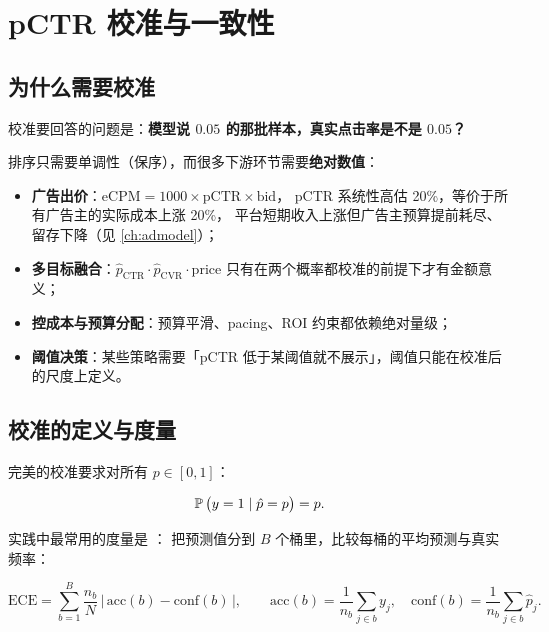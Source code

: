 \section{pCTR 校准与一致性}

\subsection{为什么需要校准}

校准要回答的问题是：\textbf{模型说 $0.05$ 的那批样本，真实点击率是不是 $0.05$？}

排序只需要单调性（保序），而很多下游环节需要\textbf{绝对数值}：

\begin{itemize}
  \item \textbf{广告出价}：$\mathrm{eCPM} = 1000 \times \mathrm{pCTR} \times \mathrm{bid}$，
        pCTR 系统性高估 20\%，等价于所有广告主的实际成本上涨 20\%，
        平台短期收入上涨但广告主预算提前耗尽、留存下降（见 \cref{ch:admodel}）；
  \item \textbf{多目标融合}：$\hat{p}_{\mathrm{CTR}} \cdot \hat{p}_{\mathrm{CVR}} \cdot \text{price}$
        只有在两个概率都校准的前提下才有金额意义；
  \item \textbf{控成本与预算分配}：预算平滑、pacing、ROI 约束都依赖绝对量级；
  \item \textbf{阈值决策}：某些策略需要「pCTR 低于某阈值就不展示」，阈值只能在校准后的尺度上定义。
\end{itemize}

\subsection{校准的定义与度量}

完美的校准要求对所有 $p \in [0,1]$：

\begin{equation}
\operatorname{\mathbb{P}}\big( y = 1 \mid \hat{p} = p \big) = p .
\label{eq:calibration-def}
\end{equation}

实践中最常用的度量是 ：
把预测值分到 $B$ 个桶里，比较每桶的平均预测与真实频率：

\begin{equation}
\mathrm{ECE} = \sum_{b=1}^{B} \frac{n_b}{N} \, \Big| \, \mathrm{acc}(b) - \mathrm{conf}(b) \, \Big| ,
\qquad
\mathrm{acc}(b) = \frac{1}{n_b}\sum_{j \in b} y_j, \quad
\mathrm{conf}(b) = \frac{1}{n_b}\sum_{j \in b} \hat{p}_j .
\label{eq:ece}
\end{equation}

